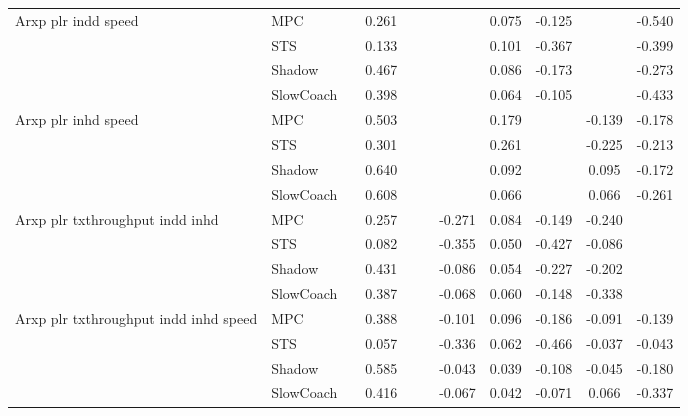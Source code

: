 \begin{tabular}{|l|l|*{9}{c|}}
\midrule
Arxp plr indd speed    & MPC &       &     0.261 &        &     &     &  0.075 &  -0.125 &      &   -0.540 \\
                              & STS &       &     0.133 &        &     &     &  0.101 &  -0.367 &      &   -0.399 \\
                              & Shadow &       &     0.467 &        &     &     &  0.086 &  -0.173 &      &   -0.273 \\
                              & SlowCoach &       &     0.398 &        &     &     &  0.064 &  -0.105 &      &   -0.433 \\
\midrule
Arxp plr inhd speed    & MPC &       &     0.503 &        &     &     &  0.179 &      &  -0.139 &   -0.178 \\
                              & STS &       &     0.301 &        &     &     &  0.261 &      &  -0.225 &   -0.213 \\
                              & Shadow &       &     0.640 &        &     &     &  0.092 &      &   0.095 &   -0.172 \\
                              & SlowCoach &       &     0.608 &        &     &     &  0.066 &      &   0.066 &   -0.261 \\
\midrule
Arxp plr txthroughput indd inhd    & MPC &       &     0.257 &        &     & -0.271 &  0.084 &  -0.149 &  -0.240 &       \\
                              & STS &       &     0.082 &        &     & -0.355 &  0.050 &  -0.427 &  -0.086 &       \\
                              & Shadow &       &     0.431 &        &     & -0.086 &  0.054 &  -0.227 &  -0.202 &       \\
                              & SlowCoach &       &     0.387 &        &     & -0.068 &  0.060 &  -0.148 &  -0.338 &       \\
\midrule
Arxp plr txthroughput indd inhd speed    & MPC &       &     0.388 &        &     & -0.101 &  0.096 &  -0.186 &  -0.091 &   -0.139 \\
                              & STS &       &     0.057 &        &     & -0.336 &  0.062 &  -0.466 &  -0.037 &   -0.043 \\
                              & Shadow &       &     0.585 &        &     & -0.043 &  0.039 &  -0.108 &  -0.045 &   -0.180 \\
                              & SlowCoach &       &     0.416 &        &     & -0.067 &  0.042 &  -0.071 &   0.066 &   -0.337 \\

\end{tabular}

